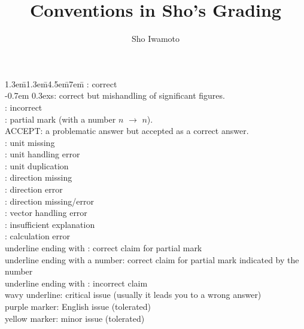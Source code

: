 \documentclass[11pt,pdfa,lastpage,minititle]{MishoNote}
\title{Conventions in Sho's Grading}
\author{Sho Iwamoto}
\begin{document}
\maketitle

\begin{tabbing}
  \kern1.3em\=\kern1.3em\=\kern4.5em\=\kern7em\=\kill
  \>: correct\\
  \kern-0.7em \raise0.3ex\hbox{\small\textsf s}\>: correct but mishandling of significant figures.\\
  \>: incorrect\\
  \>: partial mark (with a number $n$ $\to$ $n$)\footnotemark.\\[.5em]
  \textsf{ACCEPT}: a problematic answer but accepted as a correct answer.\\[1em]


  \>\>: unit missing\\
  \>\>: unit handling error\\
  \>\>: unit duplication\\
  \>\>: direction missing\\
  \>\>: direction error\\
  \>\>: direction missing/error\\
  \>\>: vector handling error\\
  \>\>: insufficient explanation\\
  \>\>: calculation error\\[1em]

  underline ending with \>\>\>\>: correct claim for partial mark\\
  underline ending with a number\>\>\>\>: correct claim for partial mark indicated by the number\\
  underline ending with \>\>\>\>: incorrect claim\\[1em]

  wavy underline\>\>\>: critical issue (usually it leads you to a wrong answer)\\
  purple marker\>\>\>: English issue (tolerated)\\
  yellow marker\>\>\>: minor issue (tolerated)\\
\end{tabbing}
\end{document}
